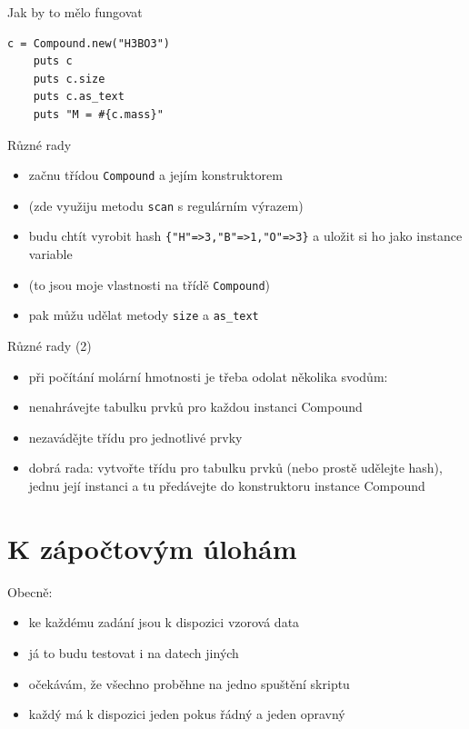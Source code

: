 \documentclass{beamer}
\begin{document}
\begin{frame}[fragile]{Jak by to mělo fungovat}
  \begin{Verbatim}[fontsize=\small]
    c = Compound.new("H3BO3")
    puts c
    puts c.size
    puts c.as_text
    puts "M = #{c.mass}"
  \end{Verbatim}
\end{frame}


\begin{frame}[fragile]{Různé rady}
  \begin{itemize}
    \item začnu třídou \texttt{Compound} a jejím konstruktorem
    \item (zde využiju metodu \texttt{scan} s regulárním výrazem)
    \item budu chtít vyrobit hash \verb|{"H"=>3,"B"=>1,"O"=>3}| a uložit si ho jako instance variable
    \item (to jsou moje vlastnosti na třídě \texttt{Compound})
    \item pak můžu udělat metody \texttt{size} a \texttt{as\_text}
  \end{itemize}
\end{frame}

\begin{frame}[fragile]{Různé rady (2)}
  \begin{itemize}
    \item při počítání molární hmotnosti je třeba odolat několika svodům:
    \item nenahrávejte tabulku prvků pro každou instanci Compound
    \item nezavádějte třídu pro jednotlivé prvky
    \item dobrá rada: vytvořte třídu pro tabulku prvků (nebo prostě udělejte hash), jednu její instanci a tu předávejte do konstruktoru instance Compound
  \end{itemize}
\end{frame}

\section{K zápočtovým úlohám}

\begin{frame}{Obecně:}
\begin{itemize}
  \item ke každému zadání jsou k dispozici vzorová data
  \item já to budu testovat i na datech jiných
  \item očekávám, že všechno proběhne na jedno spuštění skriptu
  \item každý má k dispozici jeden pokus řádný a jeden opravný
\end{itemize}
\end{frame}
\end{document}
